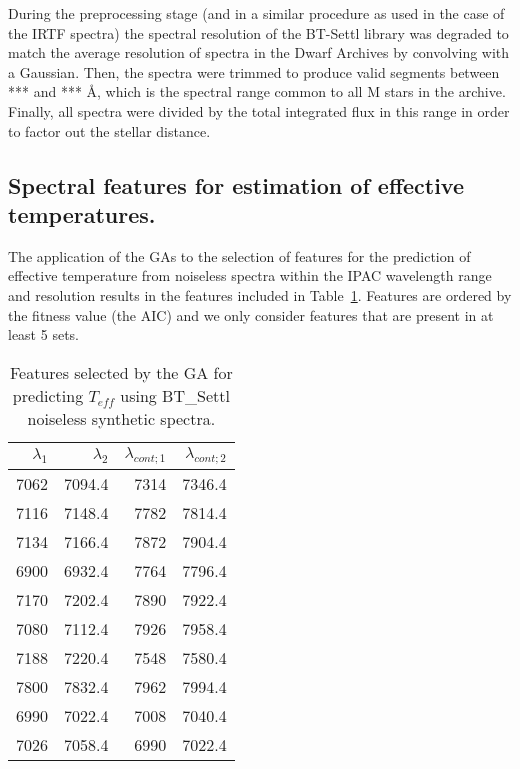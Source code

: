 
During the preprocessing stage (and in a similar procedure as used in
the case of the IRTF spectra) the spectral resolution of the BT-Settl
library was degraded to match the average resolution of spectra in the
Dwarf Archives by convolving with a Gaussian. Then, the spectra were
trimmed to produce valid segments between *** and *** {\AA}, which is
the spectral range common to all M stars in the archive. Finally, all
spectra were divided by the total integrated flux in this range in
order to factor out the stellar distance.

\subsection{Spectral features for estimation of effective temperatures.}

The application of the GAs to the selection of features for the
prediction of effective temperature from noiseless spectra within the
IPAC wavelength range and resolution results in the features included
in Table~\ref{tab:tab_NC_T}. Features are ordered by the fitness value
(the AIC) and we only consider features that are present in at least 5
sets.

\begin{table}
\begin{center}
\begin{tabular}{rrrr}
  \hline
  $\lambda_1$ & $\lambda_2$ & $\lambda_{cont;1}$ & $\lambda_{cont;2} $ \\ 
  \hline 
  
7062 & 7094.4 &	7314 & 7346.4 \\
7116 & 7148.4 &	7782 & 7814.4 \\
7134 & 7166.4 &	7872 & 7904.4 \\
6900 & 6932.4 &	7764 & 7796.4 \\
7170 & 7202.4 &	7890 & 7922.4 \\
7080 & 7112.4 &	7926 & 7958.4 \\
7188 & 7220.4 &	7548 & 7580.4 \\
7800 & 7832.4 &	7962 & 7994.4 \\
6990 & 7022.4 &	7008 & 7040.4 \\
7026 & 7058.4 &	6990 & 7022.4 \\

\hline
\end{tabular}
\caption {Features selected by the GA for predicting $T_{eff}$ 
      using BT\_Settl noiseless synthetic
      spectra. } \label{tab:tab_NC_T}
\end{center}
\end{table}

